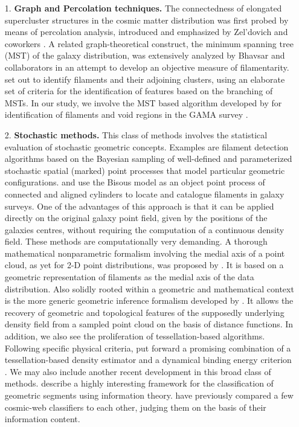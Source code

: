 \documentclass[useAMS,usenatbib]{mnras}
\begin{document}
\begin{itemize}
\item[1.] {\bf Graph and Percolation techniques.} The connectedness of elongated supercluster structures in the cosmic matter distribution 
was first probed by means of percolation analysis, introduced and emphasized by Zel'dovich and coworkers \citep{zeldovich1982,shandzeld1989,
shandarin2004}. A related graph-theoretical construct, the minimum spanning tree (MST) of the galaxy distribution, was extensively 
analyzed by Bhavsar and collaborators \citep{barrow1985,graham1995,colberg2007} in an attempt to develop an objective measure of filamentarity. 
\citet{colberg2007} set out to identify filaments and their adjoining clusters, using an elaborate set of criteria for the identification of 
features based on the branching of MSTs. In our study, we involve the MST based algorithm developed by \cite{2014MNRAS.440L.106A} for identification 
of filaments and void regions in the GAMA survey \citep{2014MNRAS.438..177A}. 

\item[2.] {\bf Stochastic methods.} This class of methods involves the statistical evaluation of stochastic geometric concepts. Examples are 
 filament detection algorithms based on the Bayesian sampling of well-defined and parameterized stochastic spatial (marked) point 
processes that model particular geometric configurations. \citet{stoica2005,2007JRSSC..56....1S,2010A&A...510A..38S} and \citet{2016AC....16...17T} use the Bisous model as an object point process of connected and aligned cylinders to locate and catalogue filaments in galaxy surveys. One of the advantages of this approach is that it can be applied directly on the original galaxy point field, given by the positions of the galaxies centres, without requiring the computation of a continuous density field. These 
methods are computationally very demanding. A thorough mathematical nonparametric formalism involving the medial axis of a point cloud, as yet 
for 2-D point distributions, was proposed by \cite{genovese2010}. It is based on a geometric representation of filaments as the medial axis of 
the data distribution. Also solidly rooted within a geometric and mathematical context is the more generic geometric inference formalism 
developed by \cite{chazal2009}. It allows the recovery of geometric and topological features of the supposedly underlying density field from a 
sampled point cloud on the basis of distance functions. In addition, we also see the proliferation of tessellation-based algorithms. Following 
specific physical criteria, \cite{gonzalez2010} put forward a promising combination of a tessellation-based density estimator 
and a dynamical binding energy criterion \citep[also see][]{weyschaap2009}. We may also include another recent development in this broad 
class of methods. \cite{leclercq2015,leclercq2015c} describe a highly interesting framework for the classification of 
geometric segments using information theory. \cite{leclercq2016} have  previously compared a few cosmic-web classifiers to each other, judging them on the basis of their information content.
\end{itemize}
\end{document}
